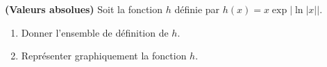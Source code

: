 
\begin{exercice}  \;
\textbf{(Valeurs absolues)}
Soit la fonction $h$ d\'efinie par $h(x)=x\exp{|\ln{|x|}|}.$
\begin{enumerate}
 \item 
Donner l'ensemble de d\'efinition de $h$.
\item 
Repr\'esenter graphiquement la fonction $h$.
\end{enumerate}
\end{exercice}